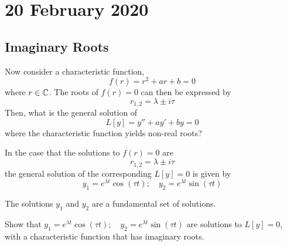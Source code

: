 \documentclass[diffeq.tex]{subfiles}
\begin{document}
\chapter{20 February 2020}
\section{Imaginary Roots}
Now consider a characteristic function,
\begin{equation}
    f(r) = r^{2} + ar + b = 0
\end{equation}
where $r \in \mathbb{C}$. The roots of $f(r) = 0$ can then be expressed by
\begin{equation}
    r_{1,2} = \lambda \pm i\tau
\end{equation}
Then, what is the general solution of
\begin{equation}
    L[y] = y'' + ay' + by = 0
\end{equation}
where the characteristic function yields non-real roots?
\begin{theorem}
    In the case that the solutions to $f(r) = 0$ are
    \begin{equation}
        r_{1,2} = \lambda \pm i\tau
    \end{equation}
    the general solution of the corresponding $L[y] = 0$ is given by
    \begin{equation}
        y_{1} = e^{\lambda t}\cos(\tau t);\quad y_{2} = e^{\lambda t}\sin(\tau t)
    \end{equation}
    
    The solutions $y_{1}$ and $y_{2}$ are a fundamental set of solutions.
\end{theorem}
\begin{homework}
    Show that $y_{1} = e^{\lambda t}\cos(\tau t);\quad y_{2} = e^{\lambda t}\sin(\tau t)$ are solutions to $L[y] = 0$, with a characteristic function that has imaginary roots.
\end{homework}
\end{document}
